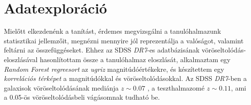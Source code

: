 \documentclass[12pt,letterpaper,twoside,openright]{book}
\begin{document}
 \section{Adatexploráció}
 Mielőtt elkezdenénk a tanítást, érdemes megvizsgálni a tanulóhalmazunk statisztikai jellemzőit, megnézni mennyire jól reprezentálja a valóságot, valamint feltárni az  összefüggéseket. Ehhez az SDSS \textit{DR7}-es adatbázisának vöröseltolódás-eloszlásával hasonlítottam össze a tanulóhalmaz eloszlását, alkalmaztam egy \textit{Random Forest regreesort} az \textit{ugriz} magnitúdóértékekre, és készítettem egy \textit{korrelációs térképet} a magnitúdókkal és vöröseltolódásokkal. 
 \newline\indent
 Az SDSS \textit{DR7}-ben a galaxisok vöröseltolódásának mediánja $z\sim0.07$ \cite{rsd}, a teszthalmazomé $z\sim0.11$, ami a 0.05-ös vöröseltolódásbeli vágásomnak tudható be.  
\end{document}
